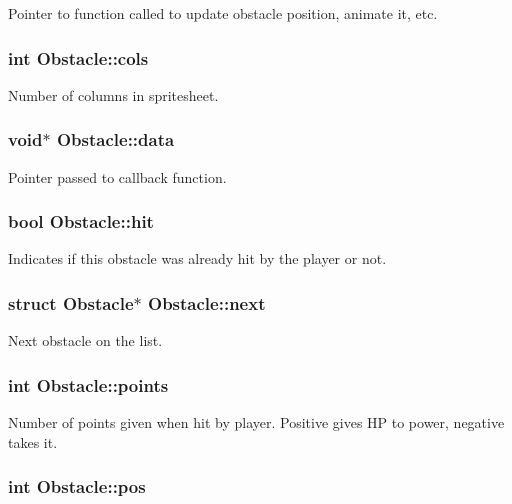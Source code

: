 \-Pointer to function called to update obstacle position, animate it, etc. \hypertarget{structObstacle_ad51aa07361c732a47e78c80fae2fab7c}{
\subsubsection[{cols}]{\setlength{\rightskip}{0pt plus 5cm}int {\bf \-Obstacle\-::cols}}}\label{structObstacle_ad51aa07361c732a47e78c80fae2fab7c}
\-Number of columns in spritesheet. \hypertarget{structObstacle_a88728e624cc62993e2bf52aff816cdff}{
\subsubsection[{data}]{\setlength{\rightskip}{0pt plus 5cm}void$\ast$ {\bf \-Obstacle\-::data}}}\label{structObstacle_a88728e624cc62993e2bf52aff816cdff}
\-Pointer passed to callback function. \hypertarget{structObstacle_ac89d025f4ad7c2f083d262c1bee4e851}{
\subsubsection[{hit}]{\setlength{\rightskip}{0pt plus 5cm}bool {\bf \-Obstacle\-::hit}}}\label{structObstacle_ac89d025f4ad7c2f083d262c1bee4e851}
\-Indicates if this obstacle was already hit by the player or not. \hypertarget{structObstacle_aedbcf65351fa59ca9f18f6fba0287dc1}{
\subsubsection[{next}]{\setlength{\rightskip}{0pt plus 5cm}struct {\bf \-Obstacle}$\ast$ {\bf \-Obstacle\-::next}}}\label{structObstacle_aedbcf65351fa59ca9f18f6fba0287dc1}
\-Next obstacle on the list. \hypertarget{structObstacle_a38a164a0e4d6f6508fb65c6eff39147f}{
\subsubsection[{points}]{\setlength{\rightskip}{0pt plus 5cm}int {\bf \-Obstacle\-::points}}}\label{structObstacle_a38a164a0e4d6f6508fb65c6eff39147f}
\-Number of points given when hit by player. \-Positive gives \-H\-P to power, negative takes it. \hypertarget{structObstacle_a5228dff4dc773a66043e822fb4d6d00c}{
\subsubsection[{pos}]{\setlength{\rightskip}{0pt plus 5cm}int {\bf \-Obstacle\-::pos}}}\label{structObstacle_a5228dff4dc773a66043e822fb4d6d00c}

